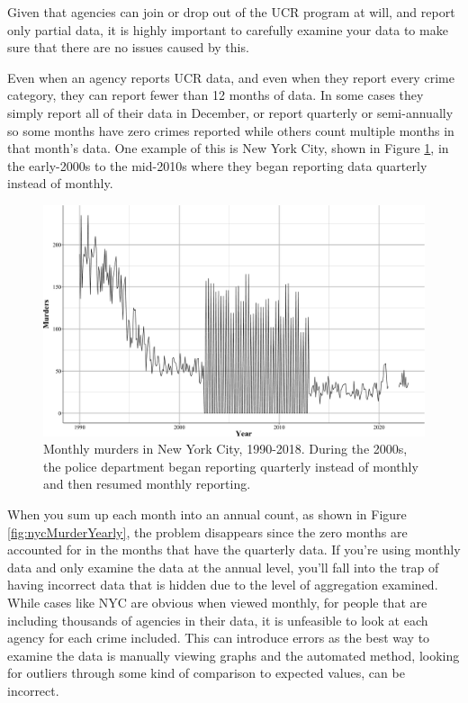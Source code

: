 \documentclass[
  12pt,
  openany]{book}
\begin{document}
Given that agencies can join or drop out of the UCR program at will, and report only partial data, it is highly important to carefully examine your data to make sure that there are no issues caused by this.

Even when an agency reports UCR data, and even when they report every crime category, they can report fewer than 12 months of data. In some cases they simply report all of their data in December, or report quarterly or semi-annually so some months have zero crimes reported while others count multiple months in that month's data. One example of this is New York City, shown in Figure \ref{fig:nycMurderMonthly}, in the early-2000s to the mid-2010s where they began reporting data quarterly instead of monthly.

\begin{figure}

{\centering \includegraphics[width=0.9\linewidth]{ucrbook_files/figure-latex/nycMurderMonthly-1} 

}

\caption{Monthly murders in New York City, 1990-2018. During the 2000s, the police department began reporting quarterly instead of monthly and then resumed monthly reporting.}\label{fig:nycMurderMonthly}
\end{figure}

When you sum up each month into an annual count, as shown in Figure \ref{fig:nycMurderYearly}, the problem disappears since the zero months are accounted for in the months that have the quarterly data. If you're using monthly data and only examine the data at the annual level, you'll fall into the trap of having incorrect data that is hidden due to the level of aggregation examined. While cases like NYC are obvious when viewed monthly, for people that are including thousands of agencies in their data, it is unfeasible to look at each agency for each crime included. This can introduce errors as the best way to examine the data is manually viewing graphs and the automated method, looking for outliers through some kind of comparison to expected values, can be incorrect.
\end{document}
